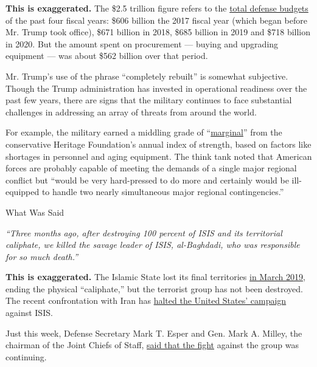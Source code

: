 \textbf{This is exaggerated.} The \$2.5 trillion figure refers to the
\href{https://comptroller.defense.gov/Portals/45/Documents/defbudget/fy2020/FY20_Green_Book.pdf\#page=29}{total
defense budgets} of the past four fiscal years: \$606 billion the 2017
fiscal year (which began before Mr. Trump took office), \$671 billion in
2018, \$685 billion in 2019 and \$718 billion in 2020. But the amount
spent on procurement --- buying and upgrading equipment --- was about
\$562 billion over that period.

Mr. Trump's use of the phrase ``completely rebuilt'' is somewhat
subjective. Though the Trump administration has invested in operational
readiness over the past few years, there are signs that the military
continues to face substantial challenges in addressing an array of
threats from around the world.

For example, the military earned a middling grade of
``\href{https://www.heritage.org/military-strength/assessment-us-military-power/conclusion-us-military-power}{marginal}''
from the conservative Heritage Foundation's annual index of strength,
based on factors like shortages in personnel and aging equipment. The
think tank noted that American forces are probably capable of meeting
the demands of a single major regional conflict but ``would be very
hard-pressed to do more and certainly would be ill-equipped to handle
two nearly simultaneous major regional contingencies.''

What Was Said

\emph{``Three months ago, after destroying 100 percent of ISIS and its
territorial caliphate, we killed the savage leader of ISIS, al-Baghdadi,
who was responsible for so much death.''}

\textbf{This is exaggerated.} The Islamic State lost its final
territories
\href{https://www.stateoig.gov/system/files/q3fy2019_leadig_oir_report.pdf}{in
March 2019}, ending the physical ``caliphate,'' but the terrorist group
has not been destroyed. The recent confrontation with Iran has
\href{https://www.nytimes3xbfgragh.onion/2020/01/05/us/politics/us-isis-iran.html}{halted
the United States' campaign} against ISIS.

Just this week, Defense Secretary Mark T. Esper and Gen. Mark A. Milley,
the chairman of the Joint Chiefs of Staff,
\href{https://www.defense.gov/Newsroom/Transcripts/Transcript/Article/2051321/press-gaggle-with-secretary-of-defense-dr-mark-t-esper-and-chairman-of-the-join/}{said
that the fight} against the group was continuing.


